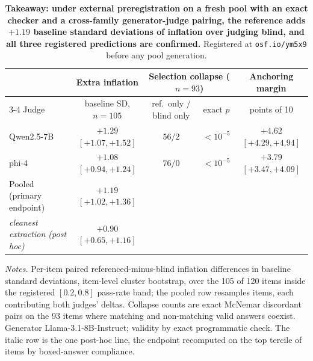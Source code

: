 \documentclass[11pt]{article}
\begin{document}
\begin{table}[tbp]
\centering
\small
\setlength{\tabcolsep}{4pt}
\begin{tabular}{lcccc}
\toprule
& Extra inflation & \multicolumn{2}{c}{Selection collapse ($n{=}93$)} & Anchoring margin \\
\cmidrule(lr){3-4}
Judge & baseline SD, $n{=}105$ & ref.\ only $/$ blind only & exact $p$ & points of 10 \\
\midrule
Qwen2.5-7B & $+1.29$ {\scriptsize$[+1.07, +1.52]$} & $56/2$ & $<10^{-5}$ & $+4.62$ {\scriptsize$[+4.29, +4.94]$} \\
phi-4      & $+1.08$ {\scriptsize$[+0.94, +1.24]$} & $76/0$ & $<10^{-5}$ & $+3.79$ {\scriptsize$[+3.47, +4.09]$} \\
Pooled (primary endpoint) & $\mathbf{+1.19}$ {\scriptsize$[+1.02, +1.36]$} & & & \\
\addlinespace[2pt]
\emph{\quad cleanest extraction (post hoc)} & $+0.90$ {\scriptsize$[+0.65, +1.16]$} & & & \\
\bottomrule
\end{tabular}

\medskip
\begin{minipage}{0.97\textwidth}
\footnotesize
\emph{Notes.}
Per-item paired referenced-minus-blind inflation differences in baseline standard deviations, item-level cluster bootstrap, over the 105 of 120 items inside the registered $[0.2, 0.8]$ pass-rate band; the pooled row resamples items, each contributing both judges' deltas. Collapse counts are exact McNemar discordant pairs on the 93 items where matching and non-matching valid answers coexist. Generator Llama-3.1-8B-Instruct; validity by exact programmatic check. The italic row is the one post-hoc line, the endpoint recomputed on the top tercile of items by boxed-answer compliance.
\end{minipage}
\caption{\textbf{Takeaway: under external preregistration on a fresh pool with an exact checker and a cross-family generator-judge pairing, the reference adds $+1.19$ baseline standard deviations of inflation over judging blind, and all three registered predictions are confirmed.}
Registered at \texttt{osf.io/ym5x9} before any pool generation.}
\label{tab:repl}
\end{table}
\end{document}
